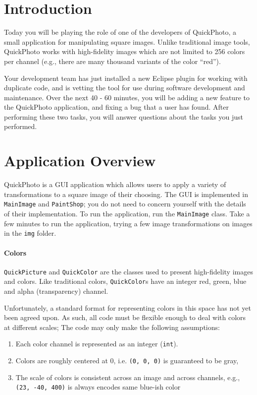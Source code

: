 \documentclass[12pt]{article}
\begin{document}
\maketitle

\section{Introduction}
Today you will be playing the role of one of the developers of
QuickPhoto, a small application for manipulating square images. Unlike
traditional image tools, QuickPhoto works with high-fidelity images
which are not limited to 256 colors per channel (e.g., there are many
thousand variants of the color ``red'').

Your
development team has just installed a new Eclipse plugin for working
with duplicate code, and is vetting the tool for use during software
development and maintenance. 
Over the next 40 - 60 minutes, you will be adding a new feature to the
QuickPhoto application, and fixing a bug that a user has found. After
performing these two tasks, you will answer questions about the tasks
you just performed.

\section{Application Overview}
QuickPhoto is a GUI application which allows users to apply a variety
of transformations to a square image of their choosing. The GUI is
implemented in \verb|MainImage| and \verb|PaintShop|; you do not need
to concern yourself with the details of their implementation. To run
the application, run the \verb|MainImage| class. Take a few minutes to
run the application, trying a few image transformations on images in the 
\verb|img| folder.

\paragraph{Colors}
\verb|QuickPicture| and \verb|QuickColor| are the classes used to
present high-fidelity images and colors.  Like traditional colors,
\verb|QuickColor|s have an integer red, green, blue and alpha
(transparency) channel.

Unfortunately, a standard format for representing colors in this space
has not yet been agreed upon.  As such, all code must be flexible
enough to deal with colors at different scales; The code may only make
the following assumptions:

\begin{enumerate}
\item Each color channel is represented as an integer (\verb|int|).
\item Colors are roughly centered at 0, i.e. \verb|(0, 0, 0)| is guaranteed
  to be gray,
\item The scale of colors is consistent across an image and across
  channels, e.g., \verb|(23, -40, 400)| is always encodes same blue-ish color
\end{enumerate}
\end{document}
